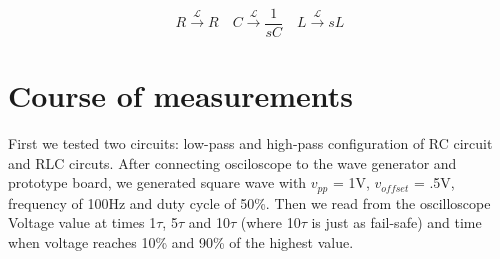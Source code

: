\documentclass[notitlepage, a4paper, 11pt]{article}
\begin{document}
	\begin{equation}\label{eq:laplace-rules}
		R \xrightarrow{\mathcal{L}} R \quad C \xrightarrow{\mathcal{L}} \frac{1}{sC} \quad L \xrightarrow{\mathcal{L}} sL
	\end{equation}
	
	
	\section{Course of measurements}
		
		First we tested two circuits: low-pass and high-pass configuration of RC circuit and RLC circuts. After connecting osciloscope to the wave generator and prototype board, we generated square wave with $v_{pp}$ = 1V, $v_{offset}$ = .5V, frequency of 100Hz and duty cycle of 50\%. Then we read from the oscilloscope Voltage value at times 1$\tau$, 5$\tau$ and 10$\tau$ (where 10$\tau$ is just as fail-safe) and time when voltage reaches 10\% and 90\% of the highest value.
		
\end{document}

